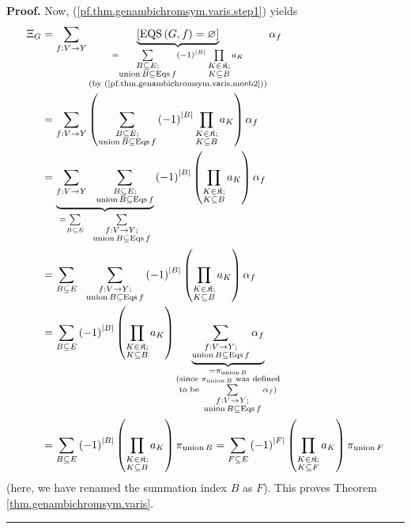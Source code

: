 \documentclass[numbers=enddot,12pt,final,onecolumn,notitlepage]{scrartcl}%
\theoremstyle{definition}
\newenvironment{proof}[1][Proof]{\noindent\textbf{#1.} }{\ \rule{0.5em}{0.5em}}
\newenvironment{verlong}{}{}
\let\sumnonlimits\sum
\let\prodnonlimits\prod
\renewcommand{\sum}{\sumnonlimits\limits}
\renewcommand{\prod}{\prodnonlimits\limits}
\begin{document}
\begin{verlong}
\begin{proof}
Now, (\ref{pf.thm.genambichromsym.varis.step1}) yields%
\begin{align*}
\Xi_{G}  &  =\sum_{f:V\rightarrow Y}\underbrace{\left[  \operatorname*{EQS}%
\left(  G,f\right)  =\varnothing\right]  }_{\substack{=\sum
_{\substack{B\subseteq E;\\\operatorname*{union}B\subseteq\operatorname*{Eqs}%
f}}\left(  -1\right)  ^{\left\vert B\right\vert }\prod_{\substack{K\in
\mathfrak{K};\\K\subseteq B}}a_{K}\\\text{(by
(\ref{pf.thm.genambichromsym.varis.moeb2}))}}}\alpha_{f}\\
&  =\sum_{f:V\rightarrow Y}\left(  \sum_{\substack{B\subseteq
E;\\\operatorname*{union}B\subseteq\operatorname*{Eqs}f}}\left(  -1\right)
^{\left\vert B\right\vert }\prod_{\substack{K\in\mathfrak{K};\\K\subseteq
B}}a_{K}\right)  \alpha_{f}\\
&  =\underbrace{\sum_{f:V\rightarrow Y}\ \ \sum_{\substack{B\subseteq
E;\\\operatorname*{union}B\subseteq\operatorname*{Eqs}f}}}_{=\sum_{B\subseteq
E}\ \ \sum_{\substack{f:V\rightarrow Y;\\\operatorname*{union}B\subseteq
\operatorname*{Eqs}f}}}\left(  -1\right)  ^{\left\vert B\right\vert }\left(
\prod_{\substack{K\in\mathfrak{K};\\K\subseteq B}}a_{K}\right)  \alpha_{f}\\
&  =\sum_{B\subseteq E}\ \ \sum_{\substack{f:V\rightarrow
Y;\\\operatorname*{union}B\subseteq\operatorname*{Eqs}f}}\left(  -1\right)
^{\left\vert B\right\vert }\left(  \prod_{\substack{K\in\mathfrak{K}%
;\\K\subseteq B}}a_{K}\right)  \alpha_{f}\\
&  =\sum_{B\subseteq E}\left(  -1\right)  ^{\left\vert B\right\vert }\left(
\prod_{\substack{K\in\mathfrak{K};\\K\subseteq B}}a_{K}\right)
\underbrace{\sum_{\substack{f:V\rightarrow Y;\\\operatorname*{union}%
B\subseteq\operatorname*{Eqs}f}}\alpha_{f}}_{\substack{=\pi
_{\operatorname*{union}B}\\\text{(since }\pi_{\operatorname*{union}B}\text{
was defined}\\\text{to be }\sum_{\substack{f:V\rightarrow
Y;\\\operatorname*{union}B\subseteq\operatorname*{Eqs}f}}\alpha_{f}\text{)}%
}}\\
&  =\sum_{B\subseteq E}\left(  -1\right)  ^{\left\vert B\right\vert }\left(
\prod_{\substack{K\in\mathfrak{K};\\K\subseteq B}}a_{K}\right)  \pi
_{\operatorname*{union}B}=\sum_{F\subseteq E}\left(  -1\right)  ^{\left\vert
F\right\vert }\left(  \prod_{\substack{K\in\mathfrak{K};\\K\subseteq F}%
}a_{K}\right)  \pi_{\operatorname*{union}F}%
\end{align*}
(here, we have renamed the summation index $B$ as $F$). This proves Theorem
\ref{thm.genambichromsym.varis}.
\end{proof}


\end{verlong}
\end{document}
